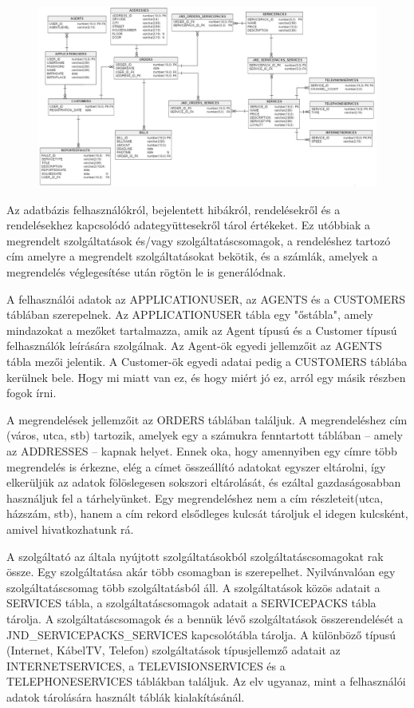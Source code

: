 \documentclass[centeredchapter]{thesis-ekf}
\theoremstyle{definition}
\theoremstyle{remark}
\begin{document}
\begin{figure}[!h]
	\centering
	\includegraphics[width=14cm]{adatbazis-modell.png}
\end{figure}


Az adatbázis felhasználókról, bejelentett hibákról, rendelésekről és a rendelésekhez kapcsolódó adategyüttesekről tárol értékeket. Ez utóbbiak a megrendelt szolgáltatások és/vagy szolgáltatáscsomagok, a rendeléshez tartozó cím amelyre a megrendelt szolgáltatásokat bekötik, és a számlák, amelyek a megrendelés véglegesítése után rögtön le is generálódnak.

A felhasználói adatok az APPLICATIONUSER, az AGENTS és a CUSTOMERS táblában szerepelnek. Az APPLICATIONUSER tábla egy "őstábla", amely mindazokat a mezőket tartalmazza, amik az Agent típusú és a Customer típusú felhasználók leírására szolgálnak. Az Agent-ök egyedi jellemzőit az AGENTS tábla mezői jelentik. A Customer-ök egyedi adatai pedig a CUSTOMERS táblába kerülnek bele. Hogy mi miatt van ez, és hogy miért jó ez, arról egy másik részben fogok írni.

A megrendelések jellemzőit az ORDERS táblában találjuk. A megrendeléshez cím (város, utca, stb) tartozik, amelyek egy a számukra fenntartott táblában -- amely az ADDRESSES -- kapnak helyet. Ennek oka, hogy amennyiben egy címre több megrendelés is érkezne, elég a címet összeállító adatokat egyszer eltárolni, így elkerüljük az adatok fölöslegesen sokszori eltárolását, és ezáltal gazdaságosabban használjuk fel a tárhelyünket. Egy megrendeléshez nem a cím részleteit(utca, házszám, stb), hanem a cím rekord elsődleges kulcsát tároljuk el idegen kulcsként, amivel hivatkozhatunk rá.

A szolgáltató az általa nyújtott szolgáltatásokból szolgáltatáscsomagokat rak össze. Egy szolgáltatása akár több csomagban is szerepelhet. Nyilvánvalóan egy szolgáltatáscsomag több szolgáltatásból áll. A szolgáltatások közös adatait a SERVICES tábla, a szolgáltatáscsomagok adatait a SERVICEPACKS tábla tárolja. A szolgáltatáscsomagok és a bennük lévő szolgáltatások összerendelését a JND\_SERVICEPACKS\_SERVICES kapcsolótábla tárolja. A különböző típusú (Internet, KábelTV, Telefon) szolgáltatások típusjellemző adatait az INTERNETSERVICES, a TELEVISIONSERVICES és a TELEPHONESERVICES táblákban találjuk. Az elv ugyanaz, mint a felhasználói adatok tárolására használt táblák kialakításánál.
\end{document}
